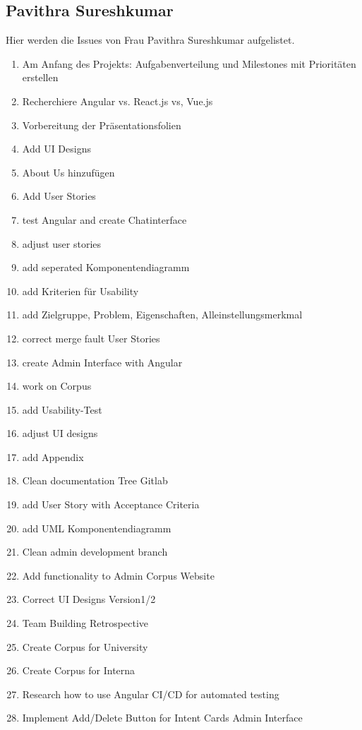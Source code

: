 \subsection{Pavithra Sureshkumar}
Hier werden die Issues von Frau Pavithra Sureshkumar aufgelistet.
\begin{enumerate}
    \item Am Anfang des Projekts: Aufgabenverteilung und Milestones mit Prioritäten erstellen 
    \item Recherchiere Angular vs. React.js vs, Vue.js
    \item Vorbereitung der Präsentationsfolien
    \item Add UI Designs
    \item About Us hinzufügen
    \item Add User Stories
    \item test Angular and create Chatinterface
    \item adjust user stories
    \item add seperated Komponentendiagramm
    \item add Kriterien für Usability
    \item add Zielgruppe, Problem, Eigenschaften, Alleinstellungsmerkmal
    \item correct merge fault User Stories
    \item create Admin Interface with Angular
    \item work on Corpus
    \item add Usability-Test
    \item adjust UI designs
    \item add Appendix
    \item Clean documentation Tree Gitlab
    \item add User Story with Acceptance Criteria
    \item add UML Komponentendiagramm
    \item Clean admin development branch
    \item Add functionality to Admin Corpus Website
    \item Correct UI Designs Version1/2
    \item Team Building Retrospective
    \item Create Corpus for University
    \item Create Corpus for Interna
    \item Research how to use Angular CI/CD for automated testing
    \item Implement Add/Delete Button for Intent Cards Admin Interface

\end{enumerate}
